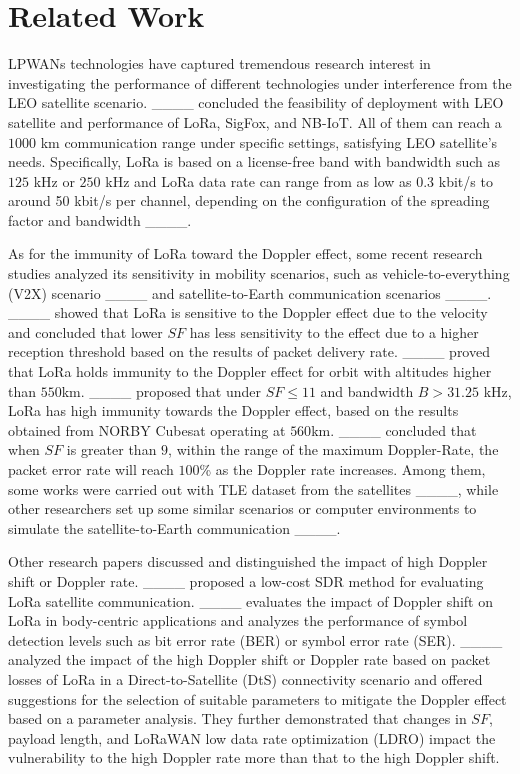 \section{Related Work}
LPWANs technologies have captured tremendous research interest in investigating the performance of different technologies under interference from the LEO satellite scenario. ____ concluded the feasibility of deployment with LEO satellite and performance of LoRa, SigFox, and NB-IoT. All of them can reach a $1000$ km communication range under specific settings, satisfying LEO satellite's needs. Specifically, LoRa is based on a license-free band with bandwidth such as $125$ kHz or $250$ kHz and LoRa data rate can range from as low as 0.3 kbit/s to around 50 kbit/s per channel, depending on the configuration of the spreading factor and bandwidth ____.

As for the immunity of LoRa toward the Doppler effect, some recent research studies analyzed its sensitivity in mobility scenarios, such as vehicle-to-everything (V2X) scenario ____
and satellite-to-Earth communication scenarios ____.  
____ showed that LoRa is sensitive to the Doppler effect due to the velocity and concluded that lower $SF$ has less sensitivity to the effect due to a higher reception threshold based on the results of packet delivery rate.
____ proved that LoRa holds immunity to the Doppler effect for orbit with altitudes higher than $550$km. ____ proposed that under $SF \leq 11$ and bandwidth $B> 31.25$ kHz, LoRa has high immunity towards the Doppler effect, based on the results obtained from NORBY Cubesat operating at $560$km.
____ concluded that when $SF$ is greater than $9$, within the range of the maximum Doppler-Rate, the packet error rate will reach $100$\% as the Doppler rate increases.  
Among them, some works were carried out with TLE dataset from the satellites ____, while other researchers set up some similar scenarios or computer environments to simulate the satellite-to-Earth communication ____.

Other research papers discussed and distinguished the impact of high Doppler shift or Doppler rate. ____ proposed a low-cost SDR method for evaluating LoRa satellite communication. 
____ evaluates the impact of Doppler shift on LoRa in body-centric applications and analyzes the performance of symbol detection levels such as bit error rate (BER) or symbol error rate (SER). 
____ analyzed the impact of the high Doppler shift or Doppler rate based on packet losses of LoRa in a Direct-to-Satellite (DtS) connectivity scenario and offered suggestions for the selection of suitable parameters to mitigate the Doppler effect based on a parameter analysis. They further demonstrated that changes in $SF$, payload length, and LoRaWAN low data rate optimization (LDRO) impact the vulnerability to the high Doppler rate more than that to the high Doppler shift.

